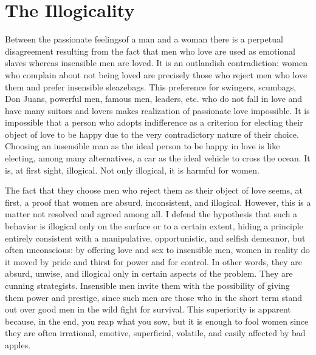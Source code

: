\section{The Illogicality}

\par Between the passionate feelings\footnotemark[7] of a man and a woman there is a perpetual disagreement resulting from the fact that men who love are used as emotional slaves whereas insensible men are loved. It is an outlandish contradiction: women who complain about not being loved are precisely those who reject men who love them and prefer insensible sleazebags. This preference for swingers, scumbags, Don Juans, powerful men, famous men, leaders, etc. who do not fall in love and have many suitors and lovers makes realization of passionate love impossible. It is impossible that a person who adopts indifference as a criterion for electing their object of love to be happy due to the very contradictory nature of their choice. Choosing an insensible man as the ideal person to be happy in love is like electing, among many alternatives, a car as the ideal vehicle to cross the ocean. It is, at first sight, illogical. Not only illogical, it is harmful for women.


\par The fact that they choose men who reject them as their object of love seems, at first, a proof that women are absurd, inconsistent, and illogical. However, this is a matter not resolved and agreed among all. I defend the hypothesis that such a behavior is illogical only on the surface or to a certain extent, hiding a principle entirely consistent with a manipulative, opportunistic, and selfish demeanor, but often unconscious: by offering love and sex to insensible men, women in reality do it moved by pride and thirst for power and for control\footnotemark[8]. In other words, they are absurd, unwise, and illogical only in certain aspects of the problem. They are cunning strategists. Insensible men invite them with the possibility of giving them power and prestige, since such men are those who in the short term stand out over good men in the wild fight for survival. This superiority is apparent because, in the end, you reap what you sow, but it is enough to fool women since they are often irrational\footnotemark[9], emotive, superficial, volatile, and easily affected by bad apples.

